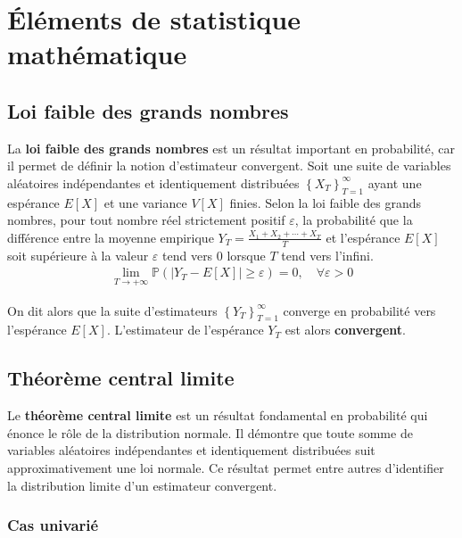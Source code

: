 \chapter{Éléments de statistique mathématique}

\section{Loi faible des grands nombres}
\label{sec:loifaible}

La \textbf{loi faible des grands nombres} est un résultat important en
probabilité, car il permet de définir la notion d'estimateur
convergent. Soit une suite de variables aléatoires indépendantes et
identiquement distribuées $\left\{X_T \right\}_{T=1}^{\infty}$ ayant
une espérance $E\left[ X \right]$ et une variance $V\left[ X \right]$
finies. Selon la loi faible des grands nombres, pour tout nombre réel
strictement positif $\varepsilon$, la probabilité que la différence
entre la moyenne empirique $Y_T=\frac{X_1+X_2+\cdots+X_T}{T}$ et
l'espérance $E\left[ X \right]$ soit supérieure à la valeur
$\varepsilon$ tend vers 0 lorsque $T$ tend vers l'infini.
\begin{align}
  \label{loifaible}
  \lim_{T \to +\infty} \mathbb{P}\left(\left|Y_T - E\left[ X
      \right]\right| \geq \varepsilon\right) = 0 ,\quad
  \forall\varepsilon>0
\end{align}

On dit alors que la suite d'estimateurs
$\left\{Y_T\right\}_{T=1}^{\infty}$ converge en probabilité vers
l'espérance $E\left[ X \right]$. L'estimateur de l'espérance $Y_T$ est
alors \textbf{convergent}.

\section{Théorème central limite}
\label{sec:theor-centr-limite}

Le \textbf{théorème central limite} est un résultat fondamental en
probabilité qui énonce le rôle de la distribution normale. Il démontre
que toute somme de variables aléatoires indépendantes et identiquement
distribuées suit approximativement une loi normale. Ce résultat permet
entre autres d'identifier la distribution limite d'un estimateur
convergent.

\subsection{Cas univarié}
\label{sec:cas-univarie}

